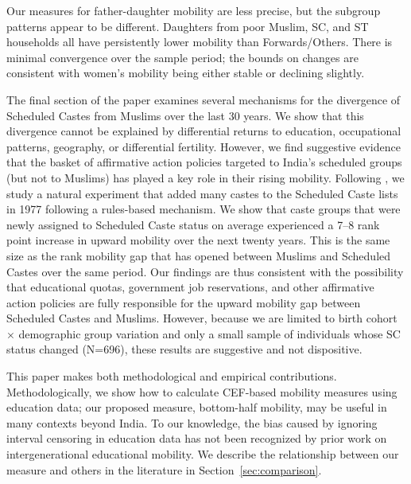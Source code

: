\documentclass[12pt,letterpaper]{article}
\numberwithin{equation}{section}
\begin{document}
Our measures for father-daughter mobility are less precise, but the subgroup patterns appear to be different. Daughters from poor Muslim, SC, and ST households all have persistently lower mobility than Forwards/Others. There is minimal convergence over the sample period; the bounds on changes are consistent with women's mobility being either stable or declining slightly.

The final section of the paper examines several mechanisms for the divergence of Scheduled Castes from Muslims over the last 30 years. We show that this divergence cannot be explained by differential returns to education, occupational patterns, geography, or differential fertility. However, we find suggestive evidence that the basket of affirmative action policies targeted to India's scheduled groups (but not to Muslims) has played a key role in their rising mobility. Following , we study a natural experiment that added many castes to the Scheduled Caste lists in 1977 following a rules-based mechanism. We show that caste groups that were newly assigned to Scheduled Caste status on average experienced a 7--8 rank point increase in upward mobility over the next twenty years. This is the same size as the rank mobility gap that has opened between Muslims and Scheduled Castes over the same period. Our findings are thus consistent with the possibility that educational quotas, government job reservations, and other affirmative action policies are fully responsible for the upward mobility gap between Scheduled Castes and Muslims. However, because we are limited to birth cohort $\times$ demographic group variation and only a small sample of individuals whose SC status changed (N=696), these results are suggestive and not dispositive. 

This paper makes both methodological and empirical contributions. Methodologically, we show how to calculate CEF-based mobility measures using education data; our proposed measure, bottom-half mobility, may be useful in many contexts beyond India. To our knowledge, the bias caused by ignoring interval censoring in education data has not been recognized by prior work on intergenerational educational mobility. We describe the relationship between our measure and others in the literature in Section~\ref{sec:comparison}.
\end{document}
